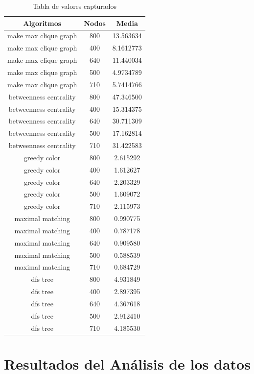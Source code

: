 \documentclass{article}
\begin{document}
\begin{table}[ht]
	\centering
		\begin{tabular}{|c|c|c|}
			\hline
			\textbf{Algoritmos} & \textbf{Nodos} & \textbf{Media} \\
			
			\hline
			 make max clique graph & 800 & 13.563634 \\
			 make max clique graph & 400 & 8.1612773 \\
			 make max clique graph & 640 & 11.440034 \\
			 make max clique graph & 500 & 4.9734789 \\
			 make max clique graph & 710 & 5.7414766 \\
			 betweenness centrality & 800 & 47.346500 \\
			 betweenness centrality & 400 & 15.314375 \\
			 betweenness centrality & 640 & 30.711309 \\
			 betweenness centrality & 500 & 17.162814 \\
			 betweenness centrality & 710 & 31.422583 \\
			 greedy color & 800 & 2.615292\\
			 greedy color & 400 & 1.612627 \\
			 greedy color & 640 & 2.203329 \\
			 greedy color & 500 & 1.609072 \\
			 greedy color & 710 & 2.115973 \\
			 maximal matching & 800 & 0.990775 \\
			 maximal matching & 400 & 0.787178 \\
			 maximal matching & 640 & 0.909580 \\
			 maximal matching & 500 & 0.588539 \\
			 maximal matching & 710 & 0.684729 \\
			 dfs tree & 800 & 4.931849\\
			 dfs tree & 400 & 2.897395 \\
			 dfs tree & 640 & 4.367618 \\
			 dfs tree & 500 & 2.912410 \\
			 dfs tree & 710 & 4.185530 \\
			\hline
		\end{tabular}
	\caption{Tabla de valores capturados}
	\label{tab:una-tablita}
\end{table}


\newpage
\section{Resultados del Análisis de los datos}
\end{document}
